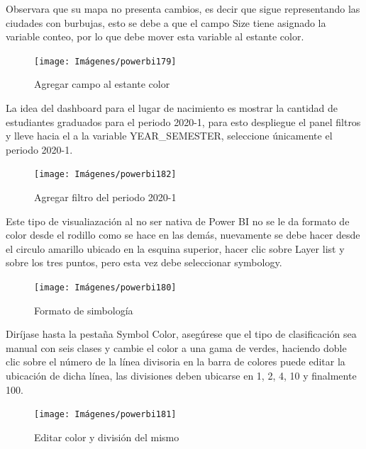 \documentclass[
]{book}
\begin{document}
Observara que su mapa no presenta cambios, es decir que sigue representando las ciudades con burbujas, esto se debe a que el campo Size tiene asignado la variable conteo, por lo que debe mover esta variable al estante color.

\begin{figure}

{\centering \texttt{[image: Imágenes/powerbi179]} 

}

\caption{Agregar campo al estante color}\label{fig:mapaarcgiscoloreado-fig}
\end{figure}

La idea del dashboard para el lugar de nacimiento es mostrar la cantidad de estudiantes graduados para el periodo 2020-1, para esto despliegue el panel filtros y lleve hacia el a la variable YEAR\_SEMESTER, seleccione únicamente el periodo 2020-1.

\begin{figure}

{\centering \texttt{[image: Imágenes/powerbi182]} 

}

\caption{Agregar filtro del periodo 2020-1}\label{fig:mapaarcgiscoloreadofiltrodeperiodo-fig}
\end{figure}

Este tipo de visualiazación al no ser nativa de Power BI no se le da formato de color desde el rodillo como se hace en las demás, nuevamente se debe hacer desde el circulo amarillo ubicado en la esquina superior, hacer clic sobre Layer list y sobre los tres puntos, pero esta vez debe seleccionar symbology.

\begin{figure}

{\centering \texttt{[image: Imágenes/powerbi180]} 

}

\caption{Formato de simbología}\label{fig:mapaarcgiseditarsimbologia-fig}
\end{figure}

Diríjase hasta la pestaña Symbol Color, asegúrese que el tipo de clasificación sea manual con seis clases y cambie el color a una gama de verdes, haciendo doble clic sobre el número de la línea divisoria en la barra de colores puede editar la ubicación de dicha línea, las divisiones deben ubicarse en 1, 2, 4, 10 y finalmente 100.

\begin{figure}

{\centering \texttt{[image: Imágenes/powerbi181]} 

}

\caption{Editar color y división del mismo}\label{fig:mapaarcgiseditarsimbologiacolor-fig}
\end{figure}
\end{document}
